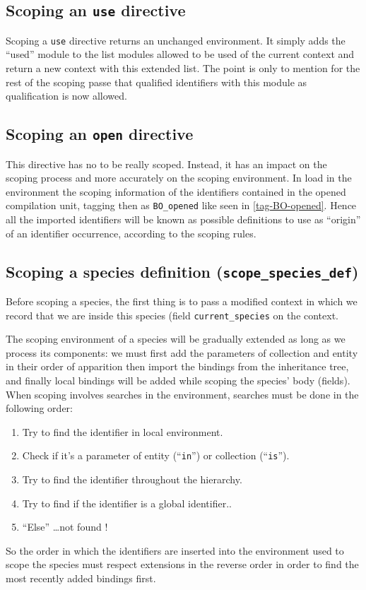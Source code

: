 \subsection{Scoping an {\tt use} directive}
Scoping a {\tt use} directive returns an unchanged environment.
It simply adds the ``used'' module to the list modules allowed to be
used of the current context and return a new context with this
extended list. The point is only to mention for the rest of the
scoping passe that qualified identifiers with this module as
qualification is now allowed.


\subsection{Scoping an {\tt open} directive}
This directive has no to be really scoped. Instead, it has an impact
on the scoping process and more accurately on the scoping environment.
In load in the environment the scoping information of the identifiers
contained in the opened compilation unit, tagging then as
{\tt BO\_opened} like seen in \ref{tag-BO-opened}. Hence all the
imported identifiers will be known as possible definitions to use as
``origin'' of an identifier occurrence, according to the scoping
rules.


\subsection{Scoping a species definition ({\tt scope\_species\_def})}
Before scoping a species, the first thing is to pass a modified
context in which we record that we are inside this species (field
{\tt current\_species} on the context.

The scoping environment of a species will be gradually extended as
long as we process its components: we must first add the parameters of
collection and entity in their order of apparition then import the
bindings from the inheritance tree, and finally local bindings will be
added while scoping the species' body (fields). When scoping involves
searches in the environment, searches must be done in the following
order:
\begin{enumerate}
\item Try to find the identifier in local environment.
\item Check if it's a parameter of entity (``{\tt in}'') or collection
  (``{\tt is}'').
\item Try to find the identifier throughout the hierarchy.
\item Try to find if the identifier is a global identifier..
\item ``Else'' \ldots not found !
\end{enumerate}
So the order in which the identifiers are inserted into the
environment used to scope the species must respect extensions in the
reverse order in order to find the most recently added bindings first.

